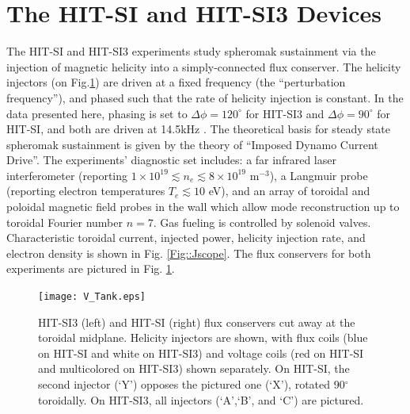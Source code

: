	
	
	\section{The HIT-SI and HIT-SI3 Devices}
	\hspace{4ex}The HIT-SI\cite{sieck2005initial} and HIT-SI3\cite{Hossack_HitSi3} experiments study spheromak sustainment via the injection of magnetic helicity into a simply-connected flux conserver. The helicity injectors (on Fig.\ref{Fig::V-Tank}) are driven at a fixed frequency (the ``perturbation frequency''), and phased such that the rate of helicity injection is constant. In the data presented here, phasing is set to  $\Delta\phi=120^\circ$ for HIT-SI3 and $\Delta\phi=90^\circ$ for HIT-SI, and both are driven at 14.5kHz . The theoretical basis for steady state spheromak sustainment is given by the theory of ``Imposed Dynamo Current Drive''\cite{jarboe2012imposed}. The experiments' diagnostic set includes: a far infrared laser interferometer (reporting $1\times10^{19}\lesssim{n_e}\lesssim8\times10^{19}$  m$^{-3}$)\cite{hossack2013reduction}, a Langmuir probe (reporting electron temperatures $T_e\lesssim10$ eV)\cite{ONeil2007experimental}, and an array of toroidal and poloidal magnetic field probes in the wall\cite{Oneil2007overview} which allow mode reconstruction up to toroidal Fourier number $n=7$. Gas fueling is controlled by solenoid valves. Characteristic toroidal current, injected power, helicity injection rate, and electron density is shown in Fig. \ref{Fig::Jscope}. The flux conservers for both experiments are pictured in Fig. \ref{Fig::V-Tank}.
	\begin{figure}
		\texttt{[image: V\_Tank.eps]}\caption{HIT-SI3 (left) and HIT-SI (right) flux conservers cut away at the toroidal midplane. Helicity injectors are shown, with flux coils (blue on HIT-SI and white on HIT-SI3) and voltage coils (red on HIT-SI and multicolored on HIT-SI3) shown separately. On HIT-SI, the second injector (`Y') opposes the pictured one (`X'), rotated 90$^\circ$ toroidally. On HIT-SI3, all injectors (`A',`B', and `C') are pictured. }\label{Fig::V-Tank}
	\end{figure}
	
	

